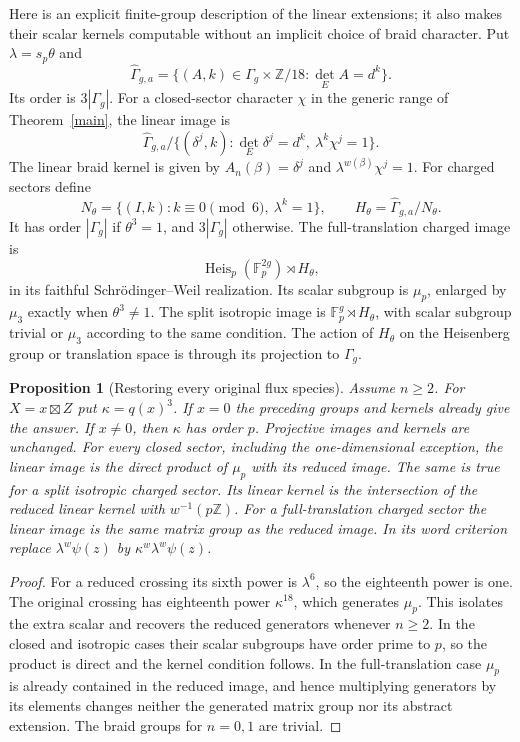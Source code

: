 \documentclass[11pt]{amsart}
\newtheorem{proposition}[theorem]{Proposition}
\newcommand{\Fp}{\mathbb F_p}
\newcommand{\Heis}{\operatorname{Heis}}
\begin{document}
Here is an explicit finite-group description of the linear extensions;
it also makes their scalar kernels computable without an implicit
choice of braid character. Put $\lambda=s_p\theta$ and
\begin{equation}\label{hat}
\widehat\Gamma_{g,a}=
\{(A,k)\in\Gamma_g\times\mathbb Z/18:\det_E A=d^k\}.
\end{equation}
Its order is $3|\Gamma_g|$.
For a closed-sector character $\chi$ in the generic range of
Theorem~\ref{main}, the linear image is
\begin{equation}\label{closedextension}
\widehat\Gamma_{g,a}/
\{(\delta^j,k):\det_E\delta^j=d^k,\ \lambda^k\chi^j=1\}.
\end{equation}
The linear braid kernel is given by $A_n(\beta)=\delta^j$ and
$\lambda^{w(\beta)}\chi^j=1$.
For charged sectors define
\[
N_\theta=\{(I,k):k\equiv0\pmod6,\ \lambda^k=1\},\qquad
H_\theta=\widehat\Gamma_{g,a}/N_\theta.
\]
It has order $|\Gamma_g|$ if $\theta^3=1$, and $3|\Gamma_g|$ otherwise.
The full-translation charged image is
\begin{equation}\label{chargedextension}
\Heis_p(\Fp^{2g})\rtimes H_\theta,
\end{equation}
in its faithful Schr\"odinger--Weil realization. Its scalar subgroup is
$\mu_p$, enlarged by $\mu_3$ exactly when $\theta^3\ne1$.
The split isotropic image is $\Fp^g\rtimes H_\theta$, with scalar
subgroup trivial or $\mu_3$ according to the same condition.
The action of $H_\theta$ on the Heisenberg group or translation space
is through its projection to $\Gamma_g$.

\begin{proposition}[Restoring every original flux species]\label{species}
Assume $n\ge2$.
For $X=x\boxtimes Z$ put $\kappa=q(x)^3$. If $x=0$ the preceding
groups and kernels already give the answer. If $x\ne0$, then $\kappa$
has order $p$. Projective images and kernels are unchanged. For every
closed sector, including the one-dimensional exception, the linear image
is the direct product of $\mu_p$ with its reduced image. The same is
true for a split isotropic charged sector. Its linear kernel is the
intersection of the reduced linear kernel with $w^{-1}(p\mathbb Z)$.
For a full-translation charged sector the linear image is the same
matrix group as the reduced image. In its word criterion replace
$\lambda^w\psi(z)$ by $\kappa^w\lambda^w\psi(z)$.
\end{proposition}
\begin{proof}
For a reduced crossing its sixth power is $\lambda^6$, so the
eighteenth power is one. The original crossing has eighteenth power
$\kappa^{18}$, which generates $\mu_p$. This isolates the extra scalar
and recovers the reduced generators whenever $n\ge2$. In the closed
and isotropic cases their scalar subgroups have order prime to $p$,
so the product is direct and the kernel condition follows. In the
full-translation case $\mu_p$ is already contained in the reduced
image, and hence multiplying generators by its elements changes
neither the generated matrix group nor its abstract extension.
The braid groups for $n=0,1$ are trivial.
\end{proof}
\end{document}
